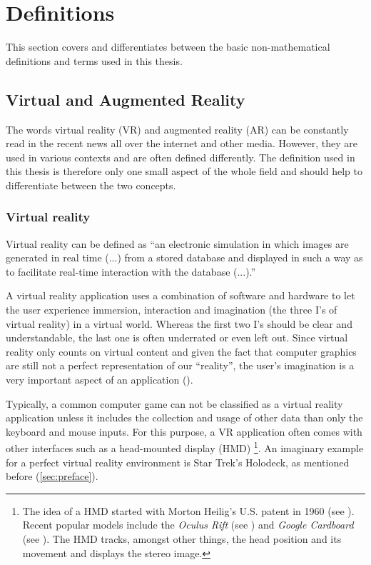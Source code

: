 \label{c:Background}
\section{Definitions}
This section covers and differentiates between the basic non-mathematical definitions and terms used in this thesis.

\subsection{Virtual and Augmented Reality}\label{sec:VAR}
The words virtual reality (VR) and augmented reality (AR) can be constantly read in the recent news all over the internet and other media. However, they are used in various contexts and are often defined differently. The definition used in this thesis is therefore only one small aspect of the whole field and should help to differentiate between the two concepts. 
\subsubsection{Virtual reality}
Virtual reality can be defined as \enquote{an electronic simulation in which images are generated in real time (...) from a stored database and displayed in such a way as to facilitate real-time interaction with the database (...).} \cite[p.148]{Latham.1995}

A virtual reality application uses a combination of software and hardware to let the user experience immersion, interaction and imagination (the three I's of virtual reality) in a virtual world. Whereas the first two I's should be clear and understandable, the last one is often underrated or even left out. Since virtual reality only counts on virtual content and given the fact that computer graphics are still not a perfect representation of our \enquote{reality}, the user's imagination is a very important aspect of an application (\cite[p.3 et seq.]{Burdea.2003}).

Typically, a common computer game can not be classified as a virtual reality application unless it includes the collection and usage of other data than only the keyboard and mouse inputs. For this purpose, a VR application often comes with other interfaces such as a head-mounted display (HMD) \footnote{The idea of a HMD started with Morton Heilig's   U.S. patent in 1960 (see \cite{Heilig.1957}). Recent popular models include the \textit{Oculus Rift} (see \cite{Oculus.2016}) and \textit{Google Cardboard} (see \cite{GoogleDev.2016}). The HMD tracks, amongst other things, the head position and its movement and displays the stereo image.}. An imaginary example for a perfect virtual reality environment is Star Trek's Holodeck, as mentioned before (\autoref{sec:preface}).

